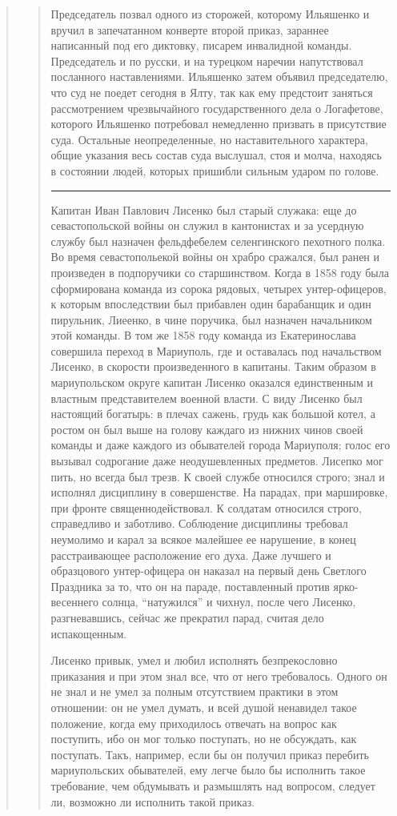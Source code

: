 \begin{quote}
\begin{quote}
Председатель позвал одного из сторожей, которому Ильяшенко и вручил в
запечатанном конверте второй приказ, зараннее написанный под его диктовку,
писарем инвалидной команды. Председатель и по русски, и на турецком наречии
напутствовал посланного наставлениями. Ильяшенко затем объявил председателю,
что суд не поедет сегодня в Ялту, так как ему предстоит заняться рассмотрением
чрезвычайного государственного дела о Логафетове, которого Ильяшенко потребовал
немедленно призвать в присутствие суда. Остальные неопределенные, но
наставительного характера, общие указания весь состав суда выслушал, стоя и
молча, находясь в состоянии людей, которых пришибли сильным ударом по голове.

\par\noindent\rule{\textwidth}{0.4pt}

Капитан Иван Павлович Лисенко был старый служака: еще до севастопольской войны
он служил в кантонистах и за усердную службу был назначен фельдфебелем
селенгинского пехотного полка. Во время севастопольекой
войны он храбро сражался, был ранен и произведен в
подпоручики со старшинством. Когда в 1858 году была
сформирована команда из сорока рядовых, четырех унтер-офицеров, к которым впоследствии был прибавлен один
барабанщик и один пирульник, Лиеенко, в чине поручика, был назначен начальником этой команды. В том 
же 1858 году команда из Екатеринослава совершила переход в Мариуполь, 
где и оставалась под начальством
Лисенко, в скорости произведенного в капитаны. Таким
образом в мариупольском округе капитан Лисенко оказался единственным и 
властным представителем военной
власти. С виду Лисенко был настоящий богатырь: в плечах сажень, 
грудь как большой котел, а ростом он
был выше на голову каждаго из нижних чинов своей
команды и даже каждого из обывателей города Мариуполя;
голос его вызывал содрогание даже неодушевленных предметов. 
Лисепко мог пить, но всегда был трезв. К своей
службе относился строго; знал и исполнял дисциплину
в совершенстве. На парадах, при маршировке, при фронте
священнодействовал. К солдатам относился строго, справедливо и заботливо. Соблюдение дисциплины требовал
неумолимо и карал за всякое малейшее ее нарушение, в конец расстраивающее расположение его духа. Даже 
лучшего и образцового унтер-офицера он наказал на первый день Светлого Праздника за то, что он 
на параде, поставленный против ярко-весеннего солнца, ``натужился'' и чихнул, после чего Лисенко, разгневавшись, сейчас
же прекратил парад, считая дело испакощенным. 

Лисенко привык, умел и любил исполнять безпрекословно приказания и при этом
знал все, что от него требовалось. Одного он не знал и не умел за полным
отсутствием  практики в этом отношении: он не умел думать, и всей душой
ненавидел такое положение, когда ему приходилось отвечать на вопрос как
поступить, ибо он мог только поступать, но не обсуждать, как поступать. Такъ,
например, если бы он получил приказ перебить мариупольских обывателей, ему
легче было бы исполнить такое требование, чем обдумывать и размышлять над
вопросом, следует ли, возможно ли исполнить такой приказ.


\end{quote}
\end{quote}
